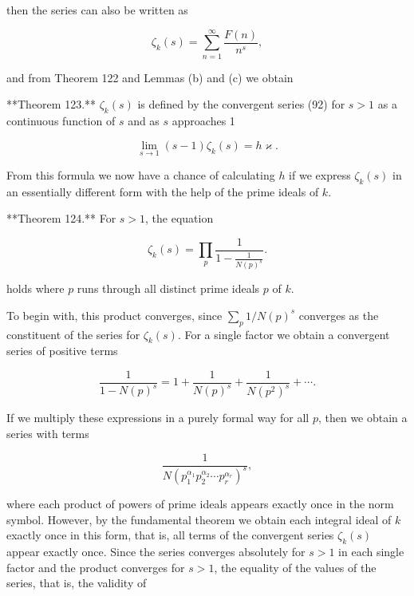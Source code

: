then the series can also be written as

$$\zeta_k(s) = \sum_{n=1}^{\infty} \frac{F(n)}{n^s},$$

and from Theorem 122 and Lemmas (b) and (c) we obtain

**Theorem 123.** $\zeta_k(s)$ is defined by the convergent series (92) for $s > 1$ as a continuous function of $s$ and as $s$ approaches 1

$$\lim_{s \to 1} (s - 1)\zeta_k(s) = h\varkappa.$$

From this formula we now have a chance of calculating $h$ if we express $\zeta_k(s)$ in an essentially different form with the help of the prime ideals of $k$.

**Theorem 124.** For $s > 1$, the equation

$$\zeta_k(s) = \prod_p \frac{1}{1 - \frac{1}{N(p)^s}}.$$

holds where $p$ runs through all distinct prime ideals $p$ of $k$.

To begin with, this product converges, since $\sum_p 1/N(p)^s$ converges as the constituent of the series for $\zeta_k(s)$. For a single factor we obtain a convergent series of positive terms

$$\frac{1}{1 - N(p)^s} = 1 + \frac{1}{N(p)^s} + \frac{1}{N(p^2)^s} + \cdots.$$

If we multiply these expressions in a purely formal way for all $p$, then we obtain a series with terms

$$\frac{1}{N(p_1^{\alpha_1} p_2^{\alpha_2} \cdots p_r^{\alpha_r})^s},$$

where each product of powers of prime ideals appears exactly once in the norm symbol. However, by the fundamental theorem we obtain each integral ideal of $k$ exactly once in this form, that is, all terms of the convergent series $\zeta_k(s)$ appear exactly once. Since the series converges absolutely for $s > 1$ in each single factor and the product converges for $s > 1$, the equality of the values of the series, that is, the validity of
